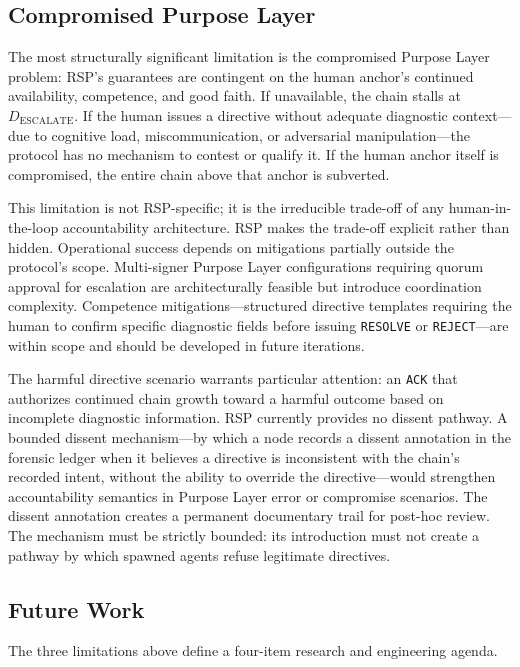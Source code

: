 \subsection{Compromised Purpose Layer}
\label{sec:rs-purpose-compromise}

The most structurally significant limitation is the compromised Purpose Layer problem: RSP's guarantees are contingent on the human anchor's continued availability, competence, and good faith. If unavailable, the chain stalls at $D_{\text{ESCALATE}}$. If the human issues a directive without adequate diagnostic context---due to cognitive load, miscommunication, or adversarial manipulation---the protocol has no mechanism to contest or qualify it. If the human anchor itself is compromised, the entire chain above that anchor is subverted.

This limitation is not RSP-specific; it is the irreducible trade-off of any human-in-the-loop accountability architecture. RSP makes the trade-off explicit rather than hidden. Operational success depends on mitigations partially outside the protocol's scope. Multi-signer Purpose Layer configurations requiring quorum approval for escalation are architecturally feasible but introduce coordination complexity. Competence mitigations---structured directive templates requiring the human to confirm specific diagnostic fields before issuing \texttt{RESOLVE} or \texttt{REJECT}---are within scope and should be developed in future iterations.

The harmful directive scenario warrants particular attention: an \texttt{ACK} that authorizes continued chain growth toward a harmful outcome based on incomplete diagnostic information. RSP currently provides no dissent pathway. A bounded dissent mechanism---by which a node records a dissent annotation in the forensic ledger when it believes a directive is inconsistent with the chain's recorded intent, without the ability to override the directive---would strengthen accountability semantics in Purpose Layer error or compromise scenarios. The dissent annotation creates a permanent documentary trail for post-hoc review. The mechanism must be strictly bounded: its introduction must not create a pathway by which spawned agents refuse legitimate directives.

\subsection{Future Work}
\label{sec:rs-future-work}

The three limitations above define a four-item research and engineering agenda.

